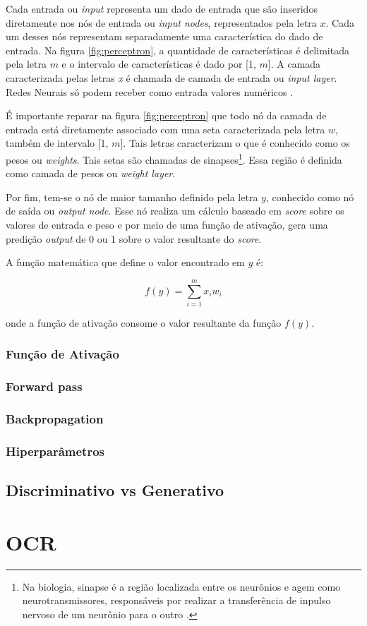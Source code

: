 Cada entrada ou \textit{input} representa um dado de entrada que são inseridos diretamente nos nós de entrada ou \textit{input nodes}, representados pela letra \(x\). Cada um desses nós representam separadamente uma característica do dado de entrada. Na figura \ref{fig:perceptron}, a quantidade de características é delimitada pela letra \(m\) e o intervalo de características é dado por [1, \(m\)]. A camada caracterizada pelas letras \textit{x} é chamada de camada de entrada ou \textit{input layer}. Redes Neurais só podem receber como entrada valores numéricos \cite{deep-learning-book}.

É importante reparar na figura \ref{fig:perceptron} que todo nó da camada de entrada está diretamente associado com uma seta caracterizada pela letra \(w\), também de intervalo [1, \(m\)]. Tais letras caracterizam o que é conhecido como os pesos ou \textit{weights}. Tais setas são chamadas de sinapses\footnote
{
  Na biologia, sinapse é a região localizada entre os neurônios e agem como neurotransmissores, responsáveis por realizar a transferência de inpulso nervoso de um neurônio para o outro \cite{synapses}.
}.
Essa região é definida como camada de pesos ou \textit{weight layer}.

Por fim, tem-se o nó de maior tamanho definido pela letra \(y\), conhecido como nó de saída ou \textit{output node}. Esse nó realiza um cálculo baseado em \textit{score} sobre os valores de entrada e peso e por meio de uma função de ativação, gera uma predição \textit{output} de 0 ou 1 sobre o valor resultante do \textit{score}.

A função matemática que define o valor encontrado em \(y\) é:

\[ f(y) = \sum_{i=1}^{m} x_iw_i \]

onde a função de ativação consome o valor resultante da função \(f(y)\).

\subsubsection{Função de Ativação}

\subsubsection{Forward pass}

\subsubsection{Backpropagation}

\subsubsection{Hiperparâmetros}

\subsection{Discriminativo vs Generativo}

\section{OCR}